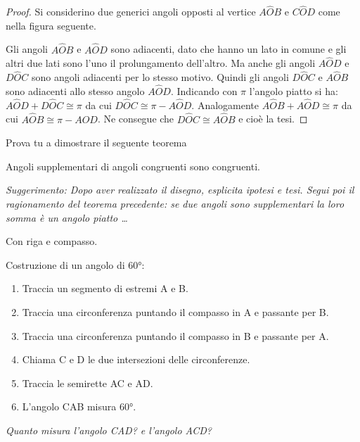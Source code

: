 \begin{proof}
Si considerino due generici angoli opposti al vertice $A\widehat{O}B$ 
e $C\widehat{O}D$ come nella figura seguente.

\begin{inaccessibleblock}
 \begin{figure}[htb]
\centering
\end{figure}
\end{inaccessibleblock}
Gli angoli $A\widehat{O}B$ e $A\widehat{O}D$ sono adiacenti, dato che 
hanno un lato in comune e gli altri due lati sono l'uno il 
prolungamento dell'altro. Ma anche gli angoli $A\widehat{O}D$ e 
$D\widehat{O}C$ sono angoli adiacenti per lo stesso motivo. Quindi 
gli angoli $D\widehat{O}C$ e $A\widehat{O}B$ sono adiacenti allo 
stesso angolo $A\widehat{O}D$.
Indicando con $\pi$ l'angolo piatto si ha: $A\widehat{O}D + 
D\widehat{O}C \cong \pi$ da cui $D\widehat{O}C\cong \pi - 
A\widehat{O}D$. Analogamente $A\widehat{O}B+A\widehat{O}D\cong\pi$ da 
cui $A\widehat{O}B\cong \pi-A\widehat{O}D$. Ne consegue che 
$D\widehat{O}C\cong A\widehat{O}B$ e cioè la tesi.
\end{proof}

Prova tu a dimostrare il seguente teorema

\begin{teorema}
Angoli supplementari di angoli congruenti sono congruenti.
\end{teorema}

\emph{Suggerimento: Dopo aver realizzato il disegno, esplicita 
ipotesi e tesi. Segui poi il ragionamento del teorema precedente: se 
due angoli sono supplementari la loro somma è un angolo piatto 
\ldots{}}

Con riga e compasso.

\begin{procedura}[Angolo di 60°]\label{proc:fonda_ang_60}
  Costruzione di un angolo di 60°:
  \begin{enumerate} [nosep]
    \item 
    Traccia un segmento di estremi A e B.  
    \item 
    Traccia una circonferenza puntando il compasso in A e passante per B.  
    \item 
    Traccia una circonferenza puntando il compasso in B e passante per A.  
    \item 
    Chiama C e D le due intersezioni delle circonferenze.
    \item
    Traccia le semirette AC e AD.
    \item
    L'angolo CAB misura 60°.
  \end{enumerate}
\end{procedura}
\textsl{Quanto misura l'angolo CAD? e l'angolo ACD?}


